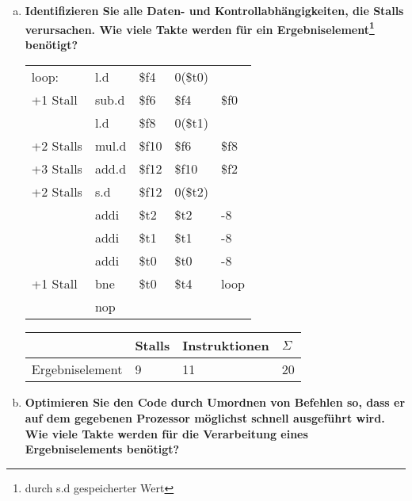 \begin{enumerate}[(a)]
	\item \textbf{Identifizieren Sie alle Daten- und Kontrollabhängigkeiten, die Stalls verursachen. Wie viele Takte werden für ein Ergebniselement\footnote{durch s.d gespeicherter Wert} benötigt?}

	{
		\ttfamily
		\begin{tabular}{l llll}
			loop:                       & l.d   & \color{blue}\$f4        & 0(\$t0)               &                  \\
			\color{blue} +1 Stall       & sub.d & \color{brown}\$f6       & \color{blue}\$f4      & \$f0             \\
			                            & l.d   & \color{cyan}\$f8        & 0(\$t1)               &                  \\
			\color{brown}+2 Stalls      & mul.d & \color{Mulberry}\$f10   & \color{brown}\$f6     & \color{cyan}\$f8 \\
			\color{Mulberry}+3 Stalls   & add.d & \color{Orange}\$f12     & \color{Mulberry}\$f10 & \$f2             \\
			\color{Orange}+2 Stalls     & s.d   & \color{Orange}\$f12     & 0(\$t2)               &                  \\
			                            & addi  & \$t2                    & \$t2                  & -8               \\
			                            & addi  & \$t1                    & \$t1                  & -8               \\
			                            & addi  & \color{Bittersweet}\$t0 & \$t0                  & -8               \\
			\color{Bittersweet}+1 Stall & bne   & \color{Bittersweet}\$t0 & \$t4                  & loop             \\
			                            & nop   &                         &                       &
		\end{tabular}
	}
	\begin{tabular}{llll}
		\hline
		                & Stalls & Instruktionen & $ \Sigma $ \\ \hline
		Ergebniselement & 9      & 11            & 20         \\ \hline
	\end{tabular}

	
	\item \textbf{Optimieren Sie den Code durch Umordnen von Befehlen so, dass er auf dem gegebenen Prozessor möglichst schnell ausgeführt wird. Wie viele Takte werden für die Verarbeitung eines Ergebniselements benötigt?}
	

\end{enumerate}
